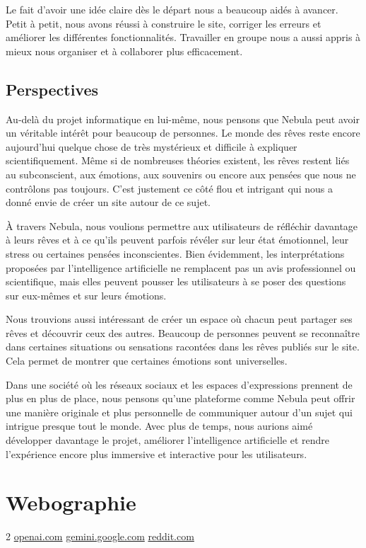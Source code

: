 \documentclass[a4paper, 12pt, twoside]{article}
\begin{document}
Le fait d’avoir une idée claire dès le départ nous a beaucoup aidés à avancer. Petit à petit, nous avons réussi à construire le site, corriger les erreurs et améliorer les différentes fonctionnalités. Travailler en groupe nous a aussi appris à mieux nous organiser et à collaborer plus efficacement.
	\subsection{Perspectives}
Au-delà du projet informatique en lui-même, nous pensons que Nebula peut avoir un véritable intérêt pour beaucoup de personnes. Le monde des rêves reste encore aujourd’hui quelque chose de très mystérieux et difficile à expliquer scientifiquement. Même si de nombreuses théories existent, les rêves restent liés au subconscient, aux émotions, aux souvenirs ou encore aux pensées que nous ne contrôlons pas toujours. C’est justement ce côté flou et intrigant qui nous a donné envie de créer un site autour de ce sujet.

À travers Nebula, nous voulions permettre aux utilisateurs de réfléchir davantage à leurs rêves et à ce qu’ils peuvent parfois révéler sur leur état émotionnel, leur stress ou certaines pensées inconscientes. Bien évidemment, les interprétations proposées par l’intelligence artificielle ne remplacent pas un avis professionnel ou scientifique, mais elles peuvent pousser les utilisateurs à se poser des questions sur eux-mêmes et sur leurs émotions.

Nous trouvions aussi intéressant de créer un espace où chacun peut partager ses rêves et découvrir ceux des autres. Beaucoup de personnes peuvent se reconnaître dans certaines situations ou sensations racontées dans les rêves publiés sur le site. Cela permet de montrer que certaines émotions sont universelles.

Dans une société où les réseaux sociaux et les espaces d’expressions prennent de plus en plus de place, nous pensons qu’une plateforme comme Nebula peut offrir une manière originale et plus personnelle de communiquer autour d’un sujet qui intrigue presque tout le monde. Avec plus de temps, nous aurions aimé développer davantage le projet, améliorer l’intelligence artificielle et rendre l’expérience encore plus immersive et interactive pour les utilisateurs.



\newpage
\section{Webographie}
\begin{thebibliography}{2}
    \url{openai.com}
    \url{gemini.google.com}
    \url{reddit.com} 
\end{thebibliography}
\end{document}

